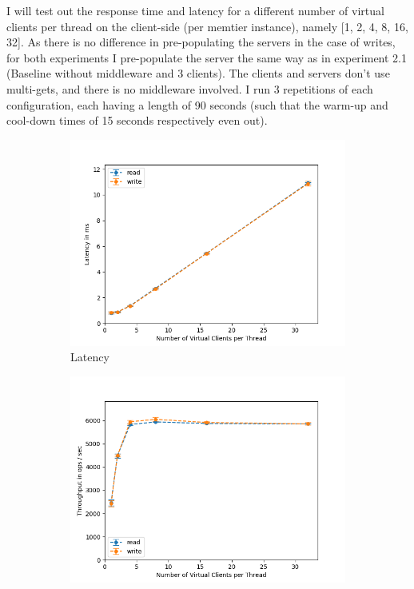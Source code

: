 \documentclass[11pt,a4paper]{article}
\begin{document}
I will test out the response time and latency for a different number of virtual clients per thread on the client-side (per memtier instance), namely [1, 2, 4, 8, 16, 32].
As there is no difference in pre-populating the servers in the case of writes, for both experiments I pre-populate the server the same way as in experiment 2.1 (Baseline without middleware and 3 clients).
The clients and servers don't use multi-gets, and there is no middleware involved.
I run 3 repetitions of each configuration, each having a length of 90 seconds (such that the warm-up and cool-down times of 15 seconds respectively even out). \\

\begin{figure}[H]
\centering
\begin{subfigure}{.5\textwidth}
    \centering
    \includegraphics[width=\textwidth]{img/exp2_2/exp2_2__latency_client_read_write.png}
    \caption{Latency}
    \label{fig:mesh1}
\end{subfigure}%
\begin{subfigure}{.5\textwidth}
      \centering
    \includegraphics[width=\textwidth]{img/exp2_2/exp2_2__throughput_client_read_write.png}

\end{subfigure}
\end{figure}
\end{document}
